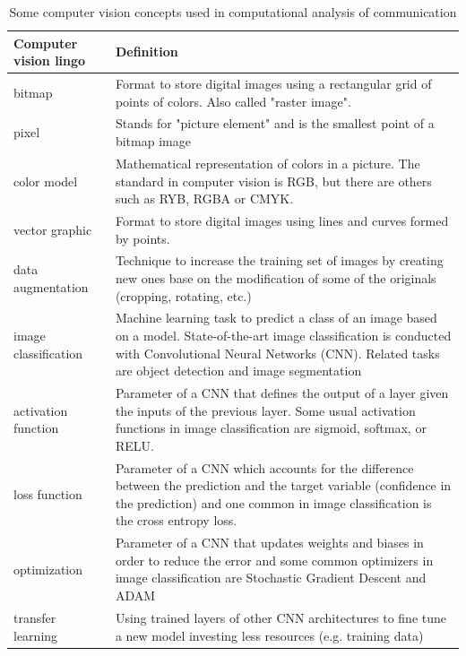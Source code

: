 \begin{table}
\caption{Some computer vision concepts used in computational analysis of communication \label{tab:visionlingo}}{
  \centering
\begin{tabularx}{\textwidth}{XX}
\toprule
Computer vision lingo  & Definition \\ \midrule
bitmap         & Format to store digital images using a rectangular grid of points of colors. Also called "raster image".\\
pixel                 & Stands for "picture element" and is the smallest point of a bitmap image  \\
color model                   & Mathematical representation of colors in a picture. The standard in computer vision is RGB, but there are others such as RYB, RGBA or CMYK.  \\
vector graphic        & Format to store digital images using lines and curves formed by points. \\
data augmentation            & Technique to increase the training set of images by creating new ones base on the modification of some of the originals (cropping, rotating, etc.) \\
image classification  & Machine learning task to predict a class of an image based on a model. State-of-the-art image classification is conducted with Convolutional Neural Networks (CNN). Related tasks are object detection and image segmentation \\
activation function            & Parameter of a CNN that defines the output of a layer given the inputs of the previous layer. Some usual activation functions in image classification are sigmoid, softmax, or RELU. \\
loss function           & Parameter of a CNN which accounts for the difference between the prediction and the target variable (confidence in the prediction) and one common in image classification is the cross entropy loss. \\
optimization           & Parameter of a CNN that updates weights and biases in order to reduce the error and some common optimizers in image classification are Stochastic Gradient Descent and ADAM \\
transfer learning             & Using trained layers of other CNN architectures to fine tune a new model investing less resources (e.g. training data) \\
\bottomrule
\end{tabularx}}{}
\end{table}


